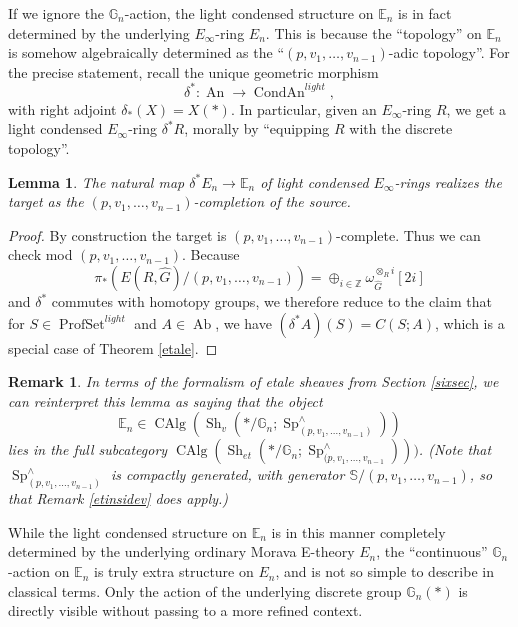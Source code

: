 \documentclass[12pt]{article}
\newtheorem{lemma}[theorem]{Lemma}
\newtheorem{remark}[theorem]{Remark}
\newcommand{\on}{\operatorname}
\begin{document}
If we ignore the $\mathbb{G}_n$-action, the light condensed structure on $\mathbb{E}_n$ is in fact determined by the underlying $E_\infty$-ring $E_n$.  This is because the ``topology'' on $\mathbb{E}_n$ is somehow algebraically determined as the ``$(p,v_1,\ldots,v_{n-1})$-adic topology''.  For the precise statement, recall the unique geometric morphism
$$\delta^\ast:\on{An}\to\on{CondAn}^{light},$$
with right adjoint $\delta_\ast(X) = X(\ast)$.  In particular, given an $E_\infty$-ring $R$, we get a light condensed $E_\infty$-ring $\delta^\ast R$, morally by ``equipping $R$ with the discrete topology''.

\begin{lemma}
The natural map $\delta^\ast E_n\to \mathbb{E}_n$ of light condensed $E_\infty$-rings realizes the target as the $(p,v_1,\ldots,v_{n-1})$-completion of the source.
\end{lemma}
\begin{proof}
By construction the target is $(p,v_1,\ldots,v_{n-1})$-complete.  Thus we can check mod $(p,v_1,\ldots,v_{n-1})$.  Because
$$\pi_\ast (E(R,\widehat{G})/(p,v_1,\ldots,v_{n-1})) = \oplus_{i\in\mathbb{Z}} \omega_{\widehat{G}}^{\otimes_R i}[2i]$$
and $\delta^\ast$ commutes with homotopy groups, we therefore reduce to the claim that for $S\in\on{ProfSet}^{light}$ and $A\in\on{Ab}$, we have $(\delta^\ast A)(S)=C(S;A)$, which is a special case of Theorem \ref{etale}.
\end{proof}

\begin{remark}\label{eisetale}
In terms of the formalism of etale sheaves from Section \ref{sixsec}, we can reinterpret this lemma as saying that the object
$$\mathbb{E}_n\in\on{CAlg}(\on{Sh}_v(\ast/\mathbb{G}_n;\on{Sp}^\wedge_{(p,v_1,\ldots,v_{n-1})}))$$
lies in the full subcategory $\on{CAlg}(\on{Sh}_{et}(\ast/\mathbb{G}_n;\on{Sp}^\wedge_{(p,v_1,\ldots,v_{n-1}})))$.  (Note that $\on{Sp}^\wedge_{(p,v_1,\ldots,v_{n-1})}$ is compactly generated, with generator $\mathbb{S}/(p,v_1,\ldots,v_{n-1})$, so that Remark \ref{etinsidev} does apply.)
\end{remark}



While the light condensed structure on $\mathbb{E}_n$ is in this manner completely determined by the underlying ordinary Morava E-theory $E_n$, the ``continuous'' $\mathbb{G}_n$-action on $\mathbb{E}_n$ is truly extra structure on $E_n$, and is not so simple to describe in classical terms.  Only the action of the underlying discrete group $\mathbb{G}_n(\ast)$ is directly visible without passing to a more refined context.
\end{document}
